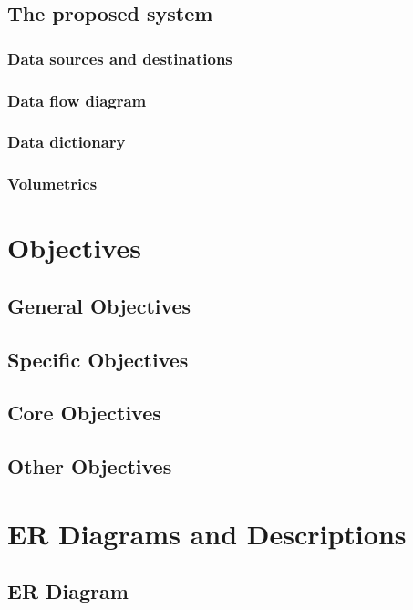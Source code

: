 \subsection{The proposed system}

\subsubsection{Data sources and destinations}

\subsubsection{Data flow diagram}

\subsubsection{Data dictionary}

\subsubsection{Volumetrics}

\section{Objectives}

\subsection{General Objectives}

\subsection{Specific Objectives}

\subsection{Core Objectives}

\subsection{Other Objectives}

\section{ER Diagrams and Descriptions}

\subsection{ER Diagram}

